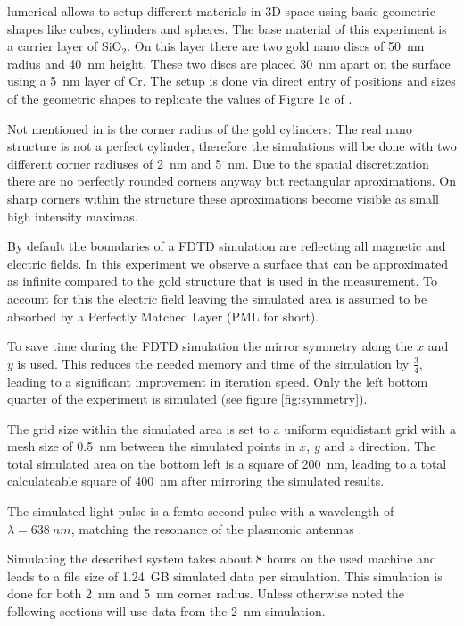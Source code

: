 lumerical allows to setup different materials in 3D space using basic geometric shapes like cubes, cylinders and spheres. The base material of this experiment is a carrier layer of SiO$_2$. On this layer there are two gold nano discs of \SI{50}{nm} radius and \SI{40}{nm} height. These two discs are placed \SI{30}{nm} apart on the surface using a \SI{5}{nm} layer of Cr. The setup is done via direct entry of positions and sizes of the geometric shapes to replicate the values of Figure 1c of \cite{heeg}.

Not mentioned in \cite{heeg} is the corner radius of the gold cylinders: The real nano structure is not a perfect cylinder, therefore the simulations will be done with two different corner radiuses of \SI{2}{nm} and \SI{5}{nm}. Due to the spatial discretization there are no perfectly rounded corners anyway but rectangular aproximations. On sharp corners within the structure these aproximations become visible as small high intensity maximas.

By default the boundaries of a FDTD simulation are reflecting all magnetic and electric fields. In this experiment we observe a surface that can be approximated as infinite compared to the gold structure that is used in the measurement. To account for this the electric field leaving the simulated area is assumed to be absorbed by a Perfectly Matched Layer (PML for short).

To save time during the FDTD simulation the mirror symmetry along the $x$ and $y$ is used. This reduces the needed memory and time of the simulation by $\frac{3}{4}$, leading to a significant improvement in iteration speed. Only the left bottom quarter of the experiment is simulated (see figure \ref{fig:symmetry}).

The grid size within the simulated area is set to a uniform equidistant grid with a mesh size of \SI{0.5}{nm} between the simulated points in $x$, $y$ and $z$ direction. The total simulated area on the bottom left is a square of \SI{200}{nm}, leading to a total calculateable square of \SI{400}{nm} after mirroring the simulated results.

The simulated light pulse is a femto second pulse with a wavelength of $\lambda=\SI{638}{nm}$, matching the resonance of the plasmonic antennas \cite{heeg}.

Simulating the described system takes about 8 hours on the used machine and leads to a file size of \SI{1.24}{GB} simulated data per simulation. This simulation is done for both \SI{2}{nm} and \SI{5}{nm} corner radius. Unless otherwise noted the following sections will use data from the \SI{2}{nm} simulation.

